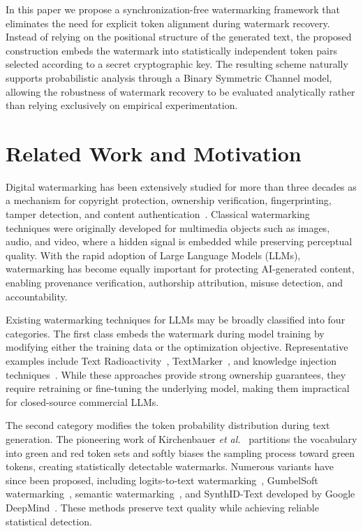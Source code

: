 \documentclass[a4paper,11pt]{llncs}
\begin{document}
In this paper we propose a synchronization-free watermarking framework that eliminates the need for explicit token alignment during watermark recovery. Instead of relying on the positional structure of the generated text, the proposed construction embeds the watermark into statistically independent token pairs selected according to a secret cryptographic key. The resulting scheme naturally supports probabilistic analysis through a Binary Symmetric Channel model, allowing the robustness of watermark recovery to be evaluated analytically rather than relying exclusively on empirical experimentation.

\section{Related Work and Motivation}

Digital watermarking has been extensively studied for more than three decades as a mechanism for copyright protection, ownership verification, fingerprinting, tamper detection, and content authentication~\cite{cox2007}. Classical watermarking techniques were originally developed for multimedia objects such as images, audio, and video, where a hidden signal is embedded while preserving perceptual quality. With the rapid adoption of Large Language Models (LLMs), watermarking has become equally important for protecting AI-generated content, enabling provenance verification, authorship attribution, misuse detection, and accountability.

Existing watermarking techniques for LLMs may be broadly classified into four categories. The first class embeds the watermark during model training by modifying either the training data or the optimization objective. Representative examples include Text Radioactivity~\cite{Sander_2024}, TextMarker~\cite{Liu_2023}, and knowledge injection techniques~\cite{Cui_2025}. While these approaches provide strong ownership guarantees, they require retraining or fine-tuning the underlying model, making them impractical for closed-source commercial LLMs.

The second category modifies the token probability distribution during text generation. The pioneering work of Kirchenbauer \emph{et al.}~\cite{kirchenbauer2023watermark} partitions the vocabulary into green and red token sets and softly biases the sampling process toward green tokens, creating statistically detectable watermarks. Numerous variants have since been proposed, including logits-to-text watermarking~\cite{wong_2025}, GumbelSoft watermarking~\cite{Fu_2024}, semantic watermarking~\cite{Kuditipudi2024}, and SynthID-Text developed by Google DeepMind~\cite{Nature2024SynthID}. These methods preserve text quality while achieving reliable statistical detection.
\end{document}
